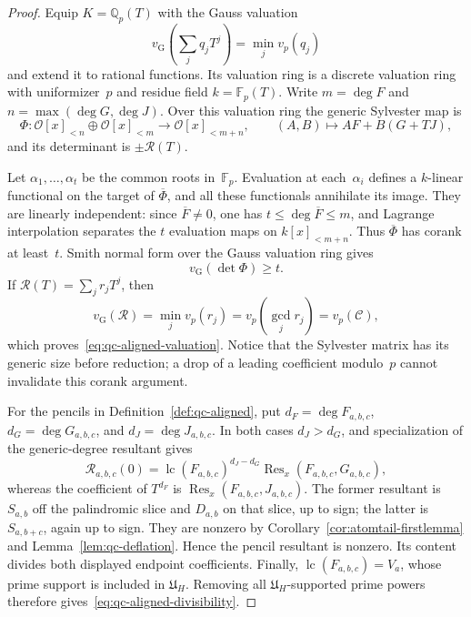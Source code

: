\begin{proof}
Equip $K=\mathbb Q_p(T)$ with the Gauss valuation
\[
 v_{\mathrm G}\!\left(\sum_jq_jT^j\right)=\min_jv_p(q_j)
\]
and extend it to rational functions.  Its valuation ring is a discrete
valuation ring with uniformizer~$p$ and residue field
$k=\mathbb F_p(T)$.  Write $m=\deg F$ and
$n=\max(\deg G,\deg J)$.  Over this valuation ring the generic
Sylvester map is
\[
 \Phi:\mathcal O[x]_{<n}\oplus\mathcal O[x]_{<m}
 \longrightarrow\mathcal O[x]_{<m+n},
 \qquad (A,B)\longmapsto AF+B(G+TJ),
\]
and its determinant is $\pm\mathcal R(T)$.

Let $\alpha_1,\ldots,\alpha_t$ be the common roots in~$\mathbb F_p$.
Evaluation at each~$\alpha_i$ defines a $k$-linear functional on the
target of $\overline\Phi$, and all these functionals annihilate its
image.  They are linearly independent: since $\overline F\ne0$, one
has $t\le\deg\overline F\le m$, and Lagrange interpolation separates
the $t$ evaluation maps on $k[x]_{<m+n}$.  Thus
$\overline\Phi$ has corank at least~$t$.  Smith normal form over the
Gauss valuation ring gives
\[
 v_{\mathrm G}(\det\Phi)\ge t.
\]
If $\mathcal R(T)=\sum_jr_jT^j$, then
\[
 v_{\mathrm G}(\mathcal R)=\min_jv_p(r_j)
 =v_p\!\left(\gcd_jr_j\right)=v_p(\mathcal C),
\]
which proves~\eqref{eq:qc-aligned-valuation}.  Notice that the
Sylvester matrix has its generic size before reduction; a drop of a
leading coefficient modulo~$p$ cannot invalidate this corank argument.

For the pencils in Definition~\ref{def:qc-aligned}, put
$d_F=\deg F_{a,b,c}$, $d_G=\deg G_{a,b,c}$, and
$d_J=\deg J_{a,b,c}$.  In both cases $d_J>d_G$, and specialization of
the generic-degree resultant gives
\[
 \mathcal R_{a,b,c}(0)
 =\operatorname{lc}(F_{a,b,c})^{d_J-d_G}
   \operatorname{Res}_x(F_{a,b,c},G_{a,b,c}),
\]
whereas the coefficient of $T^{d_F}$ is
$\operatorname{Res}_x(F_{a,b,c},J_{a,b,c})$.  The former resultant is
$S_{a,b}$ off the palindromic slice and $D_{a,b}$ on that slice, up to
sign; the latter is $S_{a,b+c}$, again up to sign.  They are nonzero by
Corollary~\ref{cor:atomtail-firstlemma} and
Lemma~\ref{lem:qc-deflation}.  Hence the pencil resultant is nonzero.
Its content divides both displayed endpoint coefficients.  Finally,
$\operatorname{lc}(F_{a,b,c})=V_a$, whose prime support is included in
$\mathfrak U_H$.  Removing all $\mathfrak U_H$-supported prime powers
therefore gives~\eqref{eq:qc-aligned-divisibility}.
\end{proof}

